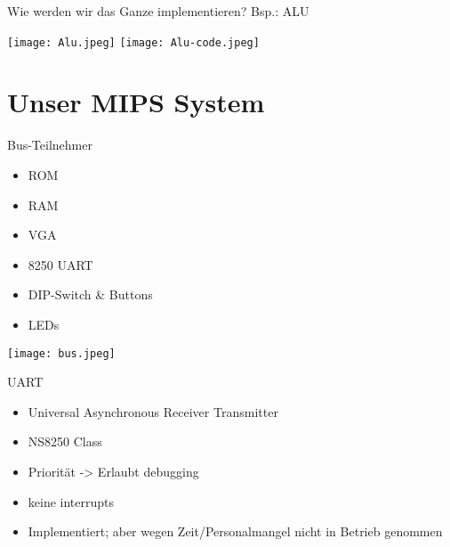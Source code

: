 


\begin{frame}{Wie werden wir das Ganze implementieren? Bsp.: ALU}

\begin{center}

\texttt{[image: Alu.jpeg]}
\texttt{[image: Alu-code.jpeg]}
\end{center}
\end{frame}
\section{Unser MIPS System}

\begin{frame}{Bus-Teilnehmer}

\begin{itemize}
	\item ROM
	\item RAM
	\item VGA
	\item 8250 UART
	\pause
	\item DIP-Switch \& Buttons
	\item LEDs
\end{itemize}


\begin{center}
\texttt{[image: bus.jpeg]} %
\end{center}

\end{frame}

\begin{frame}{UART}

\begin{itemize}
	\item Universal Asynchronous Receiver Transmitter
	\item NS8250 Class 
	\item Priorität -> Erlaubt debugging
	\item keine interrupts
	\pause
	\item Implementiert; aber wegen Zeit/Personalmangel nicht in Betrieb genommen
\end{itemize}
\begin{center}
\end{center}


\end{frame}

